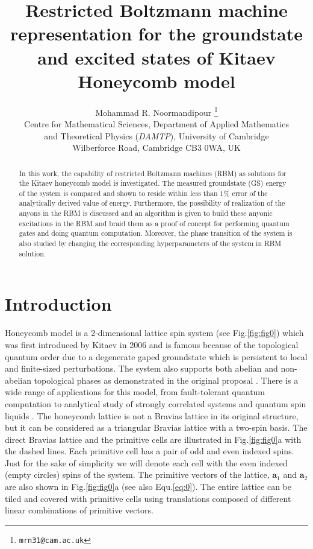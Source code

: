 \documentclass{article}
\title{Restricted Boltzmann machine representation for the groundstate and excited states of Kitaev Honeycomb model}
\author{
    Mohammad R. Noormandipour \thanks{\texttt{mrn31@cam.ac.uk}} \\
    Centre for Mathematical Sciences, Department of Applied Mathematics \\ 
    and Theoretical Physics (\textit{DAMTP}), University of Cambridge \\
    Wilberforce Road, Cambridge CB3 0WA, UK \\
}
\begin{document}
\maketitle

\begin{abstract}
In this work, the capability of restricted Boltzmann machines (RBM) as solutions for the Kitaev honeycomb model is investigated. The measured groundstate (GS) energy of the system is compared and shown to reside within less than $1\%$ error of the analytically derived value of energy. Furthermore, the possibility of realization of the anyons in the RBM is discussed and an algorithm is given to build these anyonic excitations in the RBM and braid them as a proof of concept for performing quantum gates and doing quantum computation. Moreover, the phase transition of the system is also studied by changing the corresponding hyperparameters of the system in RBM solution.
\end{abstract}




\section{Introduction}
Honeycomb model is a 2-dimensional lattice spin system (see Fig.\hspace{0.2mm}\ref{fig:fig0}) which was first introduced by Kitaev in 2006 \cite{kita} and is famous because of the topological quantum order due to a degenerate gaped groundstate which is persistent to local and finite-sized perturbations. The system also supports both abelian and non-abelian topological phases as demonstrated in the original proposal \cite{kita}. There is a wide range of applications for this model, from fault-tolerant quantum computation \cite{kita2} to analytical study of strongly correlated systems \cite{str-cor} and quantum spin liquids \cite{spi-liq}. The honeycomb lattice is not a Bravias lattice in its original structure, but it can be considered as a triangular Bravias lattice with a two-spin basis. The direct Bravias lattice and the primitive cells are illustrated in Fig.\hspace{0.2mm}\ref{fig:fig0}a with the dashed lines. Each primitive cell has a pair of odd and even indexed spins. Just for the sake of simplicity we will denote each cell with the even indexed (empty circles) spins of the system. The primitive vectors of the lattice, $\textbf{a}_1$ and $\textbf{a}_2$ are also shown in Fig.\hspace{0.2mm}\ref{fig:fig0}a (see also Equ.\hspace{0.2mm}\ref{eq:0}). The entire lattice can be tiled and covered with primitive cells using translations composed of different linear combinations of primitive vectors. 
\end{document}
